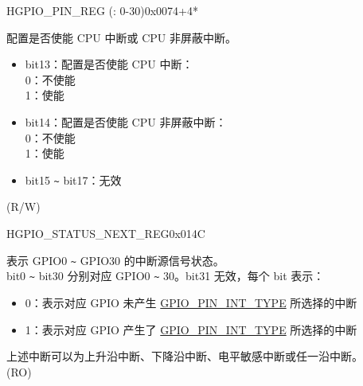 \addtocounter{Regfloat}{-1}
\begin{register}{H}{GPIO\_PIN\_REG (: 0-30)}{0x0074+4*}
\begin{regdesc}\begin{reglist}
\item [接上页]
\label{fielddesc:GPIOPINNINTENA}\item [GPIO\_PIN\regindex{n}\_INT\_ENA] 配置是否使能 CPU 中断或 CPU 非屏蔽中断。 
\begin{itemize}
    \item bit13：配置是否使能 CPU 中断：\\
    0：不使能\\
    1：使能\\
    \item bit14：配置是否使能 CPU 非屏蔽中断： \\
    0：不使能\\
    1：使能\\
    \item bit15 \verb+~+ bit17：无效
    \end{itemize} (R/W)
\end{reglist}\end{regdesc}
\end{register}


\begin{register}{H}{GPIO\_STATUS\_NEXT\_REG}{0x014C}\label{regdesc:GPIOSTATUSNEXTREG}
%
\regnewline%
\begin{regdesc}\begin{reglist}
\label{fielddesc:GPIOSTATUSINTERRUPTNEXT}\item [GPIO\_STATUS\_INTERRUPT\_NEXT] 表示 GPIO0 \verb+~+ GPIO30 的中断源信号状态。\\
bit0 \verb+~+ bit30 分别对应 GPIO0 \verb+~+ 30。bit31 无效，每个 bit 表示：
\begin{itemize}
        \item 0：表示对应 GPIO 未产生 \hyperref[fielddesc:GPIOPINNINTTYPE]{GPIO\_PIN\_INT\_TYPE} 所选择的中断
        \item 1：表示对应 GPIO 产生了 \hyperref[fielddesc:GPIOPINNINTTYPE]{GPIO\_PIN\_INT\_TYPE} 所选择的中断
    \end{itemize}
上述中断可以为上升沿中断、下降沿中断、电平敏感中断或任一沿中断。\\  (RO)
\end{reglist}\end{regdesc}
\end{register}



